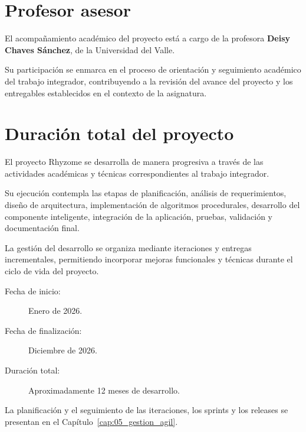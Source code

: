 \section{Profesor asesor}

El acompañamiento académico del proyecto está a cargo de la profesora \textbf{Deisy Chaves Sánchez}, de la Universidad del Valle.

Su participación se enmarca en el proceso de orientación y seguimiento académico del trabajo integrador, contribuyendo a la revisión del avance del proyecto y los entregables establecidos en el contexto de la asignatura.


\section{Duración total del proyecto}

El proyecto Rhyzome se desarrolla de manera progresiva a través de las actividades académicas y técnicas correspondientes al trabajo integrador.

Su ejecución contempla las etapas de planificación, análisis de requerimientos, diseño de arquitectura, implementación de algoritmos procedurales, desarrollo del componente inteligente, integración de la aplicación, pruebas, validación y documentación final.

La gestión del desarrollo se organiza mediante iteraciones y entregas incrementales, permitiendo incorporar mejoras funcionales y técnicas
durante el ciclo de vida del proyecto.

\begin{description}

    \item[Fecha de inicio:]
    Enero de 2026.

    \item[Fecha de finalización:]
    Diciembre de 2026.

    \item[Duración total:]
    Aproximadamente 12 meses de desarrollo.

\end{description}

La planificación y el seguimiento de las iteraciones, los sprints y los releases se presentan en el Capítulo~\ref{cap:05_gestion_agil}.